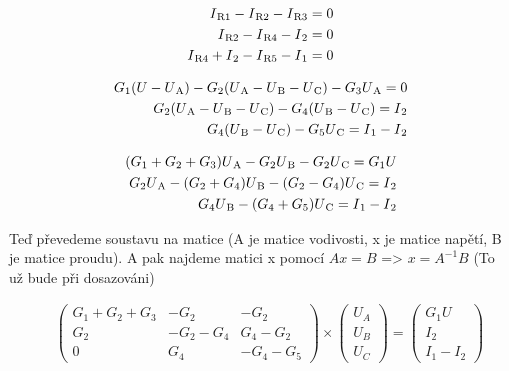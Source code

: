 \begin{align*}
    I\textsubscript{R1} - I\textsubscript{R2} - I\textsubscript{R3} = 0 \\
    I\textsubscript{R2} - I\textsubscript{R4} - I\textsubscript{2} = 0\\
    I\textsubscript{R4} + I\textsubscript{2} - I\textsubscript{R5} - I\textsubscript{1} = 0
\end{align*}

\begin{align*}
    G\textsubscript{1}(U - U\textsubscript{A}) - G\textsubscript{2}(U\textsubscript{A} - U\textsubscript{B} - U\textsubscript{C}) - G\textsubscript{3}U\textsubscript{A} = 0 \\
    G\textsubscript{2}(U\textsubscript{A} - U\textsubscript{B} - U\textsubscript{C}) - G\textsubscript{4}(U\textsubscript{B} - U\textsubscript{C}) = I\textsubscript{2} \\
    G\textsubscript{4}(U\textsubscript{B} - U\textsubscript{C}) - G\textsubscript{5}U\textsubscript{C} = I\textsubscript{1} - I\textsubscript{2}
\end{align*}

\begin{align*}
    (G\textsubscript{1} + G\textsubscript{2} + G\textsubscript{3})U\textsubscript{A} - G\textsubscript{2}U\textsubscript{B} - G\textsubscript{2}U\textsubscript{C} = G\textsubscript{1}U \\
    G\textsubscript{2}U\textsubscript{A} - (G\textsubscript{2} + G\textsubscript{4})U\textsubscript{B} - (G\textsubscript{2} - G\textsubscript{4})U\textsubscript{C} = I\textsubscript{2} \\
    G\textsubscript{4}U\textsubscript{B} - (G\textsubscript{4} + G\textsubscript{5})U\textsubscript{C} = I\textsubscript{1} - I\textsubscript{2}
\end{align*}    

Teď převedeme soustavu na matice (A je matice vodivosti, x je matice napětí, B je matice proudu). A pak najdeme matici x pomocí $Ax = B$ => $x = A^{-1}B$ (To už bude při dosazováni)

\begin{figure}[H]
\begin{align*}
\begin{pmatrix}
	G_1+G_2+G_3&-G_2&-G_2\\
	G_2&-G_2-G_4&G_4-G_2\\
	0&G_4&-G_4-G_5
\end{pmatrix}\times 
\begin{pmatrix}
	U_A\\
	U_B\\
	U_C
\end{pmatrix}=
\begin{pmatrix}
	G_1U\\
	I_2\\
	I_1-I_2
\end{pmatrix}
\end{align*}
\end{figure}

